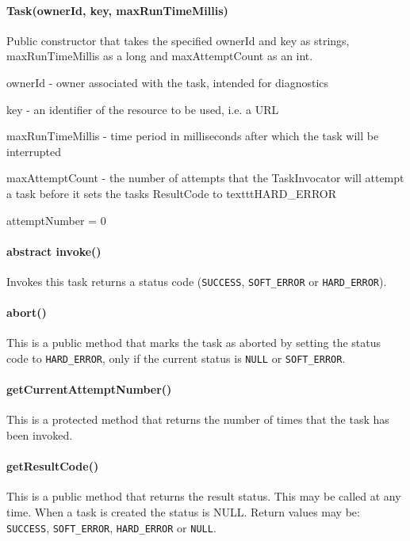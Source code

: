 \paragraph{Task(ownerId, key, maxRunTimeMillis)}
Public constructor that takes the specified ownerId and key as strings, 
maxRunTimeMillis as a long and maxAttemptCount as an int.
\begin{code}
\item ownerId - owner associated with the task, intended for diagnostics
\item key - an identifier of the resource to be used, i.e. a URL
\item maxRunTimeMillis - time period in milliseconds after which the task will 
be interrupted
\item maxAttemptCount - the number of attempts that the TaskInvocator will 
attempt a task before it sets the tasks ResultCode to texttt{HARD\_ERROR}
\end{code}

\begin{code}
\item attemptNumber = 0
\end{code}

\paragraph{abstract invoke()}
Invokes this task returns a status code (\texttt{SUCCESS}, \texttt{SOFT\_ERROR} 
or \texttt{HARD\_ERROR}).

\paragraph{abort()}This is a public method that marks the task as aborted by 
setting the status code to \texttt{HARD\_ERROR}, only if the current status is 
\texttt{NULL} or \texttt{SOFT\_ERROR}.

\paragraph{getCurrentAttemptNumber()}This is a protected method that returns 
the number of times that the task has been invoked.

\paragraph{getResultCode()}This is a public method that returns the result 
status. This may be called at any time. When a task is created the status is 
NULL. Return values may be: \texttt{SUCCESS}, \texttt{SOFT\_ERROR}, 
\texttt{HARD\_ERROR} or \texttt{NULL}.


